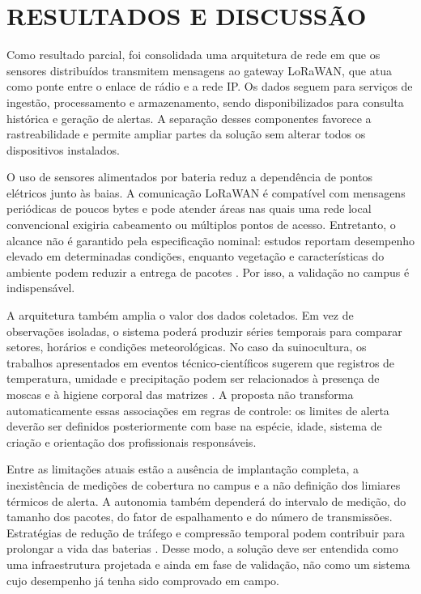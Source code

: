 \documentclass[12pt,a4paper]{article}
\begin{document}
\section{RESULTADOS E DISCUSSÃO}

Como resultado parcial, foi consolidada uma arquitetura de rede em que os sensores distribuídos transmitem mensagens ao gateway LoRaWAN, que atua como ponte entre o enlace de rádio e a rede IP. Os dados seguem para serviços de ingestão, processamento e armazenamento, sendo disponibilizados para consulta histórica e geração de alertas. A separação desses componentes favorece a rastreabilidade e permite ampliar partes da solução sem alterar todos os dispositivos instalados.

O uso de sensores alimentados por bateria reduz a dependência de pontos elétricos junto às baias. A comunicação LoRaWAN é compatível com mensagens periódicas de poucos bytes e pode atender áreas nas quais uma rede local convencional exigiria cabeamento ou múltiplos pontos de acesso. Entretanto, o alcance não é garantido pela especificação nominal: estudos reportam desempenho elevado em determinadas condições, enquanto vegetação e características do ambiente podem reduzir a entrega de pacotes \cite{fu2022,ahmed2025}. Por isso, a validação no campus é indispensável.

A arquitetura também amplia o valor dos dados coletados. Em vez de observações isoladas, o sistema poderá produzir séries temporais para comparar setores, horários e condições meteorológicas. No caso da suinocultura, os trabalhos apresentados em eventos técnico-científicos sugerem que registros de temperatura, umidade e precipitação podem ser relacionados à presença de moscas e à higiene corporal das matrizes \cite{macedo_moraes_cruz2026}. A proposta não transforma automaticamente essas associações em regras de controle: os limites de alerta deverão ser definidos posteriormente com base na espécie, idade, sistema de criação e orientação dos profissionais responsáveis.

Entre as limitações atuais estão a ausência de implantação completa, a inexistência de medições de cobertura no campus e a não definição dos limiares térmicos de alerta. A autonomia também dependerá do intervalo de medição, do tamanho dos pacotes, do fator de espalhamento e do número de transmissões. Estratégias de redução de tráfego e compressão temporal podem contribuir para prolongar a vida das baterias \cite{vaananen2022,krizanovic2023}. Desse modo, a solução deve ser entendida como uma infraestrutura projetada e ainda em fase de validação, não como um sistema cujo desempenho já tenha sido comprovado em campo.
\end{document}

